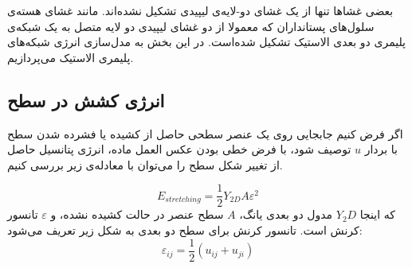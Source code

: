 \setRL

بعضی غشاها تنها از یک غشای دو‌-لایه‌ی لیپیدی تشکیل نشده‌اند. مانند غشای هسته‌ی سلول‌های پستانداران که معمولا از دو غشای لیپیدی دو لایه متصل به یک شبکه‌ی پلیمری دو بعدی الاستیک تشکیل شده‌است. در این بخش به مدل‌سازی انرژی شبکه‌های پلیمری الاستیک می‌پردازیم.
\subsection{
انرژی کشش در سطح
}
اگر فرض کنیم جابجایی روی یک عنصر سطحی حاصل از کشیده‌ یا فشرده شدن سطح با بردار 
$u$
توصیف شود، با فرض خطی بودن عکس العمل ماده، انرژی پتانسیل حاصل از تغییر شکل سطح را می‌توان با معادله‌ی زیر بررسی کنیم.

\begin{equation}
E_{stretching}=\frac{1}{2}Y_{2D}A\varepsilon^2
\end{equation}
که اینجا 
$Y_2D$
مدول دو بعدی یانگ،
$A$
سطح عنصر در حالت کشیده نشده، و
$\varepsilon$
تانسور کرنش است. تانسور کرنش برای سطح دو بعدی به شکل زیر تعریف می‌شود:
\begin{equation}
\varepsilon_{ij} = \frac{1}{2}(u_{ij}+u_{ji})
\end{equation}


